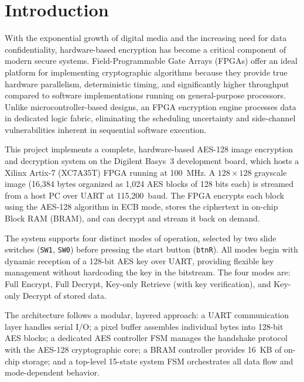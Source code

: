 \documentclass[12pt,a4paper]{article}
\begin{document}
\tableofcontents
\newpage


\section{Introduction}

With the exponential growth of digital media and the increasing need for data confidentiality, hardware-based encryption has become a critical component of modern secure systems. Field-Programmable Gate Arrays (FPGAs) offer an ideal platform for implementing cryptographic algorithms because they provide true hardware parallelism, deterministic timing, and significantly higher throughput compared to software implementations running on general-purpose processors. Unlike microcontroller-based designs, an FPGA encryption engine processes data in dedicated logic fabric, eliminating the scheduling uncertainty and side-channel vulnerabilities inherent in sequential software execution.

This project implements a complete, hardware-based AES-128 image encryption and decryption system on the Digilent Basys~3 development board, which hosts a Xilinx Artix-7 (XC7A35T) FPGA running at 100~MHz. A $128 \times 128$ grayscale image (16,384 bytes organized as 1,024 AES blocks of 128 bits each) is streamed from a host PC over UART at 115,200~baud. The FPGA encrypts each block using the AES-128 algorithm in ECB mode, stores the ciphertext in on-chip Block RAM (BRAM), and can decrypt and stream it back on demand.

The system supports four distinct modes of operation, selected by two slide switches (\texttt{SW1}, \texttt{SW0}) before pressing the start button (\texttt{btnR}). All modes begin with dynamic reception of a 128-bit AES key over UART, providing flexible key management without hardcoding the key in the bitstream. The four modes are: Full Encrypt, Full Decrypt, Key-only Retrieve (with key verification), and Key-only Decrypt of stored data.

The architecture follows a modular, layered approach: a UART communication layer handles serial I/O; a pixel buffer assembles individual bytes into 128-bit AES blocks; a dedicated AES controller FSM manages the handshake protocol with the AES-128 cryptographic core; a BRAM controller provides 16~KB of on-chip storage; and a top-level 15-state system FSM orchestrates all data flow and mode-dependent behavior.
\end{document}

